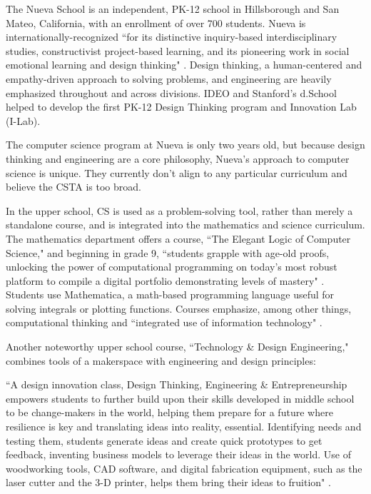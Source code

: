 The Nueva School is an independent, PK-12 school in Hillsborough and San Mateo, California, with an enrollment of over 700 students. Nueva is internationally-recognized ``for its distinctive inquiry-based interdisciplinary studies, constructivist project-based learning, and its pioneering work in social emotional learning and design thinking" \cite{nuevamis}. Design thinking, a human-centered and empathy-driven approach to solving problems, and engineering are heavily emphasized throughout and across divisions. IDEO and Stanford's d.School helped to develop the first PK-12 Design Thinking program and Innovation Lab (I-Lab).\par
The computer science program at Nueva is only two years old, but because design thinking and engineering are a core philosophy, Nueva's approach to computer science is unique. They currently don't align to any particular curriculum and believe the CSTA is too broad.\par 
In the upper school, CS is used as a problem-solving tool, rather than merely a standalone course, and is integrated into the mathematics and science curriculum. The mathematics department offers a course, ``The Elegant Logic of Computer Science," and beginning in grade 9, ``students grapple with age-old proofs, unlocking the power of computational programming on today's most robust platform to compile a digital portfolio demonstrating levels of mastery" \cite{nuevastem}. Students use Mathematica, a math-based programming language useful for solving integrals or plotting functions. Courses emphasize, among other things, computational thinking and ``integrated use of information technology" \cite{nuevastem}. \par
Another noteworthy upper school course, ``Technology \& Design Engineering," combines tools of a makerspace with engineering and design principles:
\begin{blockquote}
``A design innovation class, Design Thinking, Engineering \& Entrepreneurship empowers students to further build upon their skills developed in middle school to be change-makers in the world, helping them prepare for a future where resilience is key and translating ideas into reality, essential. Identifying needs and testing them, students generate ideas and create quick prototypes to get feedback, inventing business models to leverage their ideas in the world. Use of woodworking tools, CAD software, and digital fabrication equipment, such as the laser cutter and the 3-D printer, helps them bring their ideas to fruition" \cite{nuevastem}.
\end{blockquote}
